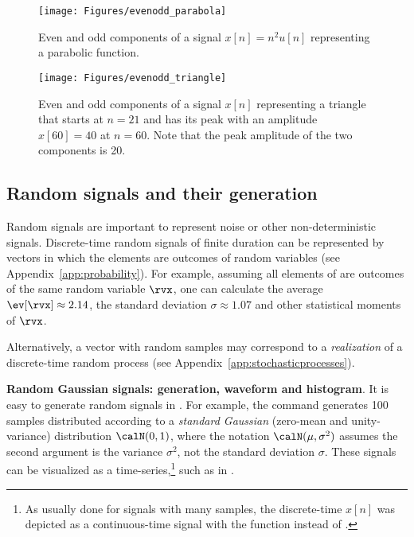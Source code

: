 \begin{figure}
	\centering
		\texttt{[image: Figures/evenodd\_parabola]}		
	\caption{Even and odd components of a signal $x[n]=n^2 u[n]$ representing a parabolic function.\label{fig:evenodd_parabola}}
\end{figure}

\begin{figure}
	\centering
		\texttt{[image: Figures/evenodd\_triangle]}		
	\caption{Even and odd components of a signal $x[n]$ representing a triangle that starts at $n=21$ and has its peak with an amplitude $x[60]=40$ at $n=60$. Note that the peak amplitude of the two components is 20.\label{fig:evenodd_triangle}}
\end{figure}


\subsection{Random signals and their generation}
\label{sec:randomSignals}

Random signals are important to represent noise or other non-deterministic signals.
Discrete-time random signals of finite duration can be represented by vectors in which the elements are outcomes of random variables (see Appendix~\ref{app:probability}).
For example, assuming all elements of \co{[2, 0, 2, 3, 3, 2, 3]} are outcomes of the same random variable
$\rvx$, one can calculate the average $\ev [\rvx] \approx 2.14$, the standard deviation $\sigma \approx 1.07$ and other statistical moments of $\rvx$. %

Alternatively, a vector with random samples may correspond to a \emph{realization} of a discrete-time random process
(see Appendix~\ref{app:stochasticprocesses}). 



\bExample \textbf{Random Gaussian signals: generation, waveform and histogram}.
It is easy to generate random signals in {\matlab}. For example, the command
 generates 100 samples distributed according to a \emph{standard Gaussian} (zero-mean and unity-variance) distribution $\calN(0,1)$, where the notation $\calN(\mu,\sigma^2)$ assumes the second argument is the variance $\sigma^2$, not the standard deviation $\sigma$. These signals can be visualized as a time-series,\footnote{As usually done for signals with many samples, the discrete-time $x[n]$ was depicted as a continuous-time signal with the  function instead of .} such as in 
.

